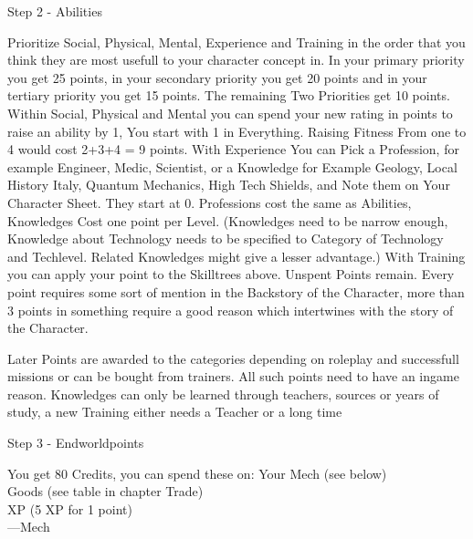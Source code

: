 \documentclass{article}
\newcommand{\subhline}[1]{\begin{center}\large #1 \normalsize \end{center}}
\begin{document}
    \subhline{Step 2 - Abilities}
    Prioritize Social, Physical, Mental, Experience and Training in the order that you think they are most
    usefull to your character concept in. \newline
    In your primary priority you get 25 points, in your secondary priority you get 20 points and in your tertiary
    priority you get 15 points. The remaining Two Priorities get 10 points.\newline
    Within Social, Physical and Mental you can spend your new rating in points to raise an ability by 1, You start with 1
    in Everything. Raising Fitness From one to 4 would cost 2+3+4 = 9 points.\newline
    With Experience You can Pick a Profession, for example Engineer, Medic, Scientist, or a Knowledge for Example
    Geology, Local History Italy, Quantum Mechanics, High Tech Shields, and Note them on Your Character Sheet. They start at
    0. Professions cost the same as Abilities, Knowledges Cost one point per Level. (Knowledges need to be narrow enough,
    Knowledge about Technology needs to be specified to Category of Technology and Techlevel. Related Knowledges might give
    a lesser advantage.)
    With Training you can apply your point to the Skilltrees above.
    Unspent Points remain. Every point requires some sort of mention in the Backstory of the Character, more than 3 points
    in something require a good reason which intertwines with the story of the Character.

    Later Points are awarded to the categories depending on roleplay and successfull missions or can be bought from
    trainers. All such points need to have an ingame reason. Knowledges can only be learned through teachers, sources or
    years of study, a new Training either needs a Teacher or a long time\\


    \subhline{Step 3 - Endworldpoints}
    You get 80 Credits, you can spend these on:
    Your Mech (see below)\\
    Goods (see table in chapter Trade)\\
    XP (5 XP for 1 point)\\

    ---Mech\newline
\end{document}
